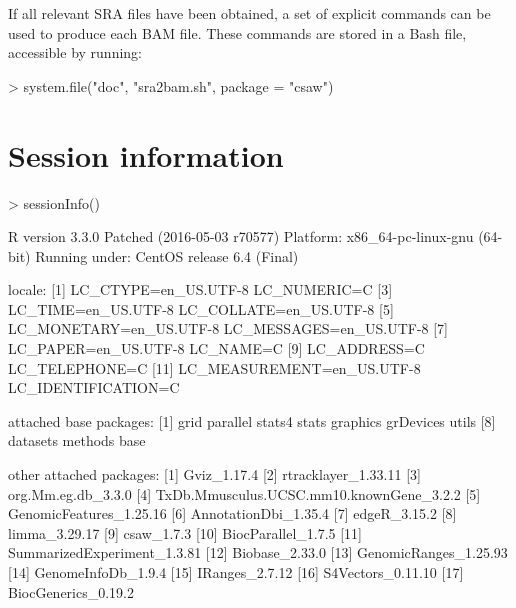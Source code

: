 \documentclass[12pt]{report}
\renewenvironment{Schunk}{\vspace{0pt}}{\vspace{0pt}}
\begin{document}
If all relevant SRA files have been obtained, a set of explicit commands can be used to produce each BAM file.
These commands are stored in a Bash file, accessible by running:

\begin{Schunk}
\begin{Sinput}
> system.file("doc", "sra2bam.sh", package = "csaw")
\end{Sinput}
\end{Schunk}

\section{Session information}
\begin{Schunk}
\begin{Sinput}
> sessionInfo()
\end{Sinput}
\begin{Soutput}
R version 3.3.0 Patched (2016-05-03 r70577)
Platform: x86_64-pc-linux-gnu (64-bit)
Running under: CentOS release 6.4 (Final)

locale:
 [1] LC_CTYPE=en_US.UTF-8       LC_NUMERIC=C              
 [3] LC_TIME=en_US.UTF-8        LC_COLLATE=en_US.UTF-8    
 [5] LC_MONETARY=en_US.UTF-8    LC_MESSAGES=en_US.UTF-8   
 [7] LC_PAPER=en_US.UTF-8       LC_NAME=C                 
 [9] LC_ADDRESS=C               LC_TELEPHONE=C            
[11] LC_MEASUREMENT=en_US.UTF-8 LC_IDENTIFICATION=C       

attached base packages:
 [1] grid      parallel  stats4    stats     graphics  grDevices utils    
 [8] datasets  methods   base     

other attached packages:
 [1] Gviz_1.17.4                             
 [2] rtracklayer_1.33.11                     
 [3] org.Mm.eg.db_3.3.0                      
 [4] TxDb.Mmusculus.UCSC.mm10.knownGene_3.2.2
 [5] GenomicFeatures_1.25.16                 
 [6] AnnotationDbi_1.35.4                    
 [7] edgeR_3.15.2                            
 [8] limma_3.29.17                           
 [9] csaw_1.7.3                              
[10] BiocParallel_1.7.5                      
[11] SummarizedExperiment_1.3.81             
[12] Biobase_2.33.0                          
[13] GenomicRanges_1.25.93                   
[14] GenomeInfoDb_1.9.4                      
[15] IRanges_2.7.12                          
[16] S4Vectors_0.11.10                       
[17] BiocGenerics_0.19.2                     


\end{Soutput}
\end{Schunk}
\end{document}
